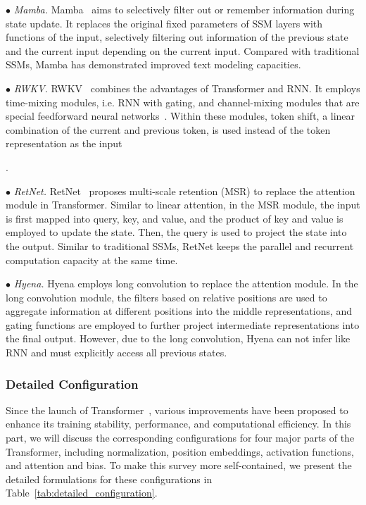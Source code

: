 {$\bullet$ \emph{Mamba.} Mamba~\cite{gu-arxiv-2023-mamba} aims to selectively {filter out or remember} information during  state update. {It replaces the original fixed parameters of SSM layers with functions of the input}, selectively {filtering out} information of the previous state and {the current input depending on the current input}. Compared with traditional SSMs, Mamba has demonstrated improved text modeling capacities.

$\bullet$ \emph{RWKV.} RWKV~\cite{peng-23-arxiv-rwkv} combines the advantages of Transformer and RNN. It employs time-mixing modules, i.e. RNN with gating, and channel-mixing modules that are special {feedforward neural networks}~\cite{peng-23-arxiv-rwkv}. Within these modules, token shift, a linear combination of the current and previous token, is used instead of the token representation as the input}. 

{$\bullet$ \emph{RetNet.} RetNet~\cite{sun-2023-arxiv-retnet} proposes multi-scale retention (MSR) to replace the attention module in Transformer. Similar to linear attention, in the MSR module, the input is first mapped into query, key, and value, and the product of key and value is employed to update the state. Then, the query is used to project the state into the output. Similar to traditional SSMs, RetNet keeps the parallel and recurrent computation capacity at the same time.}

{$\bullet$ \emph{Hyena.} Hyena employs long convolution to replace the attention module. In the long convolution module, the filters based on relative positions are used to aggregate information at different positions into the middle representations, and gating functions are employed to further project intermediate representations into the final output. However, due to the long convolution, Hyena can not infer like RNN and must explicitly access all previous states.}

\subsubsection{Detailed Configuration}
\label{sec:configuration}

Since the launch of Transformer~\cite{Vaswani-NIPS-2017-Attention}, various improvements have been proposed to enhance its training stability, performance, and computational efficiency. In this part, we will discuss the corresponding configurations for four major parts of the Transformer, including normalization, position embeddings, activation functions, and attention and bias. To make this survey more self-contained, we present the detailed formulations for these configurations in Table~\ref{tab:detailed_configuration}. 

